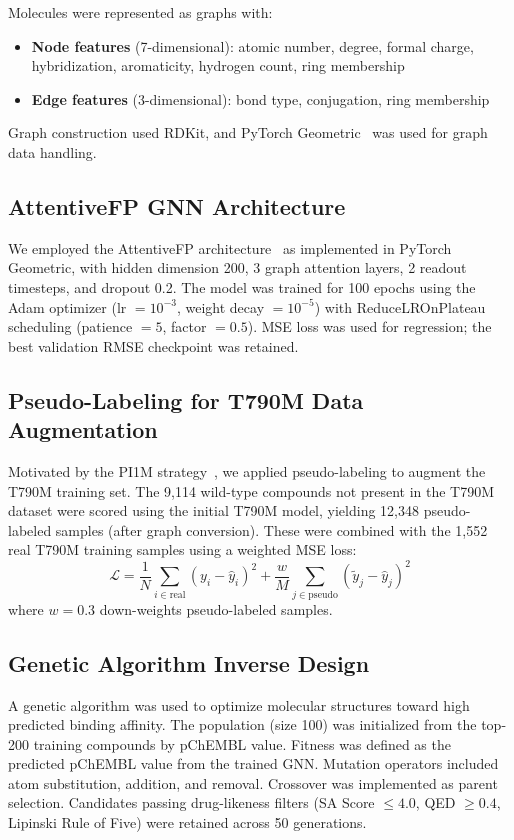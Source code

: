 \documentclass[11pt]{article}
\begin{document}
Molecules were represented as graphs with:
\begin{itemize}
    \item \textbf{Node features} (7-dimensional): atomic number, degree,
    formal charge, hybridization, aromaticity, hydrogen count, ring membership
    \item \textbf{Edge features} (3-dimensional): bond type, conjugation,
    ring membership
\end{itemize}
Graph construction used RDKit, and PyTorch Geometric~\cite{fey2019} was used
for graph data handling.

\subsection{AttentiveFP GNN Architecture}

We employed the AttentiveFP architecture~\cite{xiong2019} as implemented in
PyTorch Geometric, with hidden dimension 200, 3 graph attention layers,
2 readout timesteps, and dropout 0.2. The model was trained for 100 epochs
using the Adam optimizer (lr $= 10^{-3}$, weight decay $= 10^{-5}$) with
ReduceLROnPlateau scheduling (patience $= 5$, factor $= 0.5$).
MSE loss was used for regression; the best validation RMSE checkpoint was retained.

\subsection{Pseudo-Labeling for T790M Data Augmentation}

Motivated by the PI1M strategy~\cite{chen2021}, we applied pseudo-labeling
to augment the T790M training set.
The 9,114 wild-type compounds not present in the T790M dataset were scored
using the initial T790M model, yielding 12,348 pseudo-labeled samples
(after graph conversion).
These were combined with the 1,552 real T790M training samples using a
weighted MSE loss:
\begin{equation}
\mathcal{L} = \frac{1}{N}\sum_{i \in \text{real}} (y_i - \hat{y}_i)^2
+ \frac{w}{M}\sum_{j \in \text{pseudo}} (\tilde{y}_j - \hat{y}_j)^2
\end{equation}
where $w = 0.3$ down-weights pseudo-labeled samples.

\subsection{Genetic Algorithm Inverse Design}

A genetic algorithm was used to optimize molecular structures toward high
predicted binding affinity. The population (size 100) was initialized from
the top-200 training compounds by pChEMBL value.
Fitness was defined as the predicted pChEMBL value from the trained GNN.
Mutation operators included atom substitution, addition, and removal.
Crossover was implemented as parent selection.
Candidates passing drug-likeness filters (SA Score $\leq 4.0$, QED $\geq 0.4$,
Lipinski Rule of Five) were retained across 50 generations.
\end{document}
